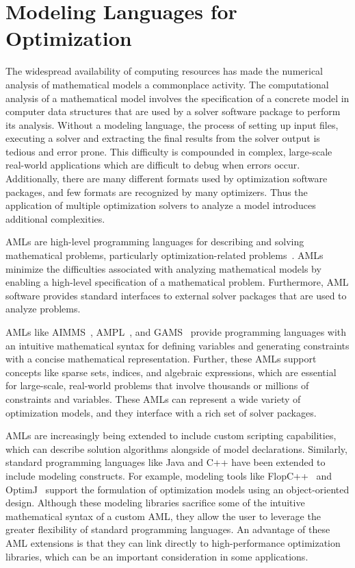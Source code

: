 \section{Modeling Languages for Optimization}
\label{sec:intro:modlang}

The widespread availability of computing resources has made the numerical
analysis of mathematical models a commonplace activity.  The computational
analysis of a mathematical model involves the specification of a concrete
model in computer data structures that are used by a solver software package to
perform its analysis.  Without a modeling language, the process of setting up input
files, executing a solver and extracting the final results from the
solver output is tedious and error prone.  This difficulty is compounded
in complex, large-scale real-world applications which are difficult to
debug when errors occur.  Additionally, there are many different formats
used by optimization software packages, and few formats are recognized by
many optimizers.  Thus the application of multiple optimization solvers
to analyze a model introduces additional complexities.

AMLs are high-level programming languages for describing and
solving mathematical problems, particularly optimization-related
problems~\citep{Kal04}.  AMLs minimize the difficulties associated with
analyzing mathematical models by enabling a high-level specification
of a mathematical problem.  Furthermore, AML software provides standard
interfaces to external solver packages that are used to analyze problems.

AMLs like AIMMS~\citep{AIMMS}, AMPL~\citep{AMPL,FouGay03}, and
GAMS~\citep{GAMS} provide programming languages with an intuitive
mathematical syntax for defining variables and generating constraints
with a concise mathematical representation.  Further, these AMLs support
concepts like sparse sets, indices, and algebraic expressions, which are
essential for large-scale, real-world problems that involve thousands
or millions of constraints and variables.  These AMLs can represent a
wide variety of optimization models, and they interface with a rich set
of solver packages.

AMLs are increasingly being extended to include custom scripting
capabilities, which can describe solution algorithms alongside of model
declarations.  Similarly, standard programming languages like Java and
C++ have been extended to include modeling constructs.  For example,
modeling tools like FlopC++~\citep{flopcpp} and OptimJ~\citep{OptimJ}
support the formulation of optimization models using an object-oriented
design.  Although these modeling libraries sacrifice some of the
intuitive mathematical syntax of a custom AML, they allow the user to
leverage the greater flexibility of standard programming languages.
An advantage of these AML extensions is that they can link directly
to high-performance optimization libraries, which can be an important
consideration in some applications.

